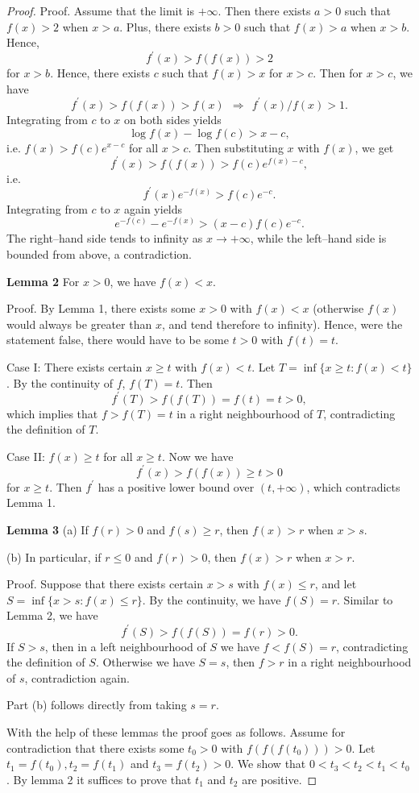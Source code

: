 \begin{1b}
\begin{enumerate}
\begin{proof}
Proof. Assume that the limit is $+\infty$. 
Then there exists $a>0$ such that $f(x)>2$ when $x>a$. 
Plus, there exists $b>0$ such that $f(x)>a$ when $x>b$. Hence, 
\[f^{\prime}(x)>f(f(x))>2\]
for $x>b$. Hence, there exists $c$ such that $f(x)>x$ for $x>c$. Then for $x>c$, we have
\[f^{\prime}(x)>f(f(x))>f(x) \ \ \Rightarrow \ \ f^{\prime}(x)/f(x)>1.\]
Integrating from $c$ to $x$ on both sides yields \[\log f(x)-\log f(c)>x-c,\]
i.e. $f(x)>f(c) e^{x-c}$ for all $x>c$. Then substituting $x$ with $f(x)$, we get
\[f^{\prime}(x)>f(f(x))>f(c) e^{f(x)-c},\]
i.e. \[f^{\prime}(x) e^{-f(x)}>f(c) e^{-c}.\]
Integrating from $c$ to $x$ again yields
\[e^{-f(c)}-e^{-f(x)}>(x-c) f(c) e^{-c}.\]
The right--hand side tends to infinity as $x\to+\infty$, 
while the left--hand side is bounded from above, a contradiction.

\textbf{Lemma 2} For $x>0$, we have $f(x)<x$.

Proof. By Lemma 1, there exists some $x>0$ with $f(x)<x$ 
(otherwise $f(x)$ would always be greater than $x$, and tend therefore to infinity). 
Hence, were the statement false, there would have to be some $t>0$ with $f(t)=t$.

Case I: There exists certain $x \geqslant t$ with $f(x)<t$. 
Let $T=\inf \{x \geqslant t: f(x)<t\}$. 
By the continuity of $f$, $f(T)=t$. Then
\[f^{\prime}(T)>f(f(T))=f(t)=t>0,\]
which implies that $f>f(T)=t$ in a right neighbourhood of $T$, 
contradicting the definition of $T$.

Case II: $f(x) \geqslant t$ for all $x \geqslant t$. Now we have
\[f^{\prime}(x)>f(f(x)) \geqslant t>0\]
for $x \geqslant t$. Then $f^{\prime}$ has a positive lower bound 
over $(t,+\infty)$, which contradicts Lemma 1.

\textbf{Lemma 3} (a) If $f(r)>0$ and $f(s) \geqslant r$, then $f(x)>r$ when $x>s$.

(b) In particular, if $r \leqslant 0$ and $f(r)>0$, then $f(x)>r$ when $x>r$.

Proof. Suppose that there exists certain $x>s$ with $f(x) \leqslant r$, 
and let $S=\inf \{x>s: f(x) \leqslant r\}$. 
By the continuity, we have $f(S)=r$. Similar to Lemma 2, we have
\[f^{\prime}(S)>f(f(S))=f(r)>0.\]
If $S>s$, then in a left neighbourhood of $S$ we have $f<f(S)=r$, 
contradicting the definition of $S$. 
Otherwise we have $S=s$, then $f>r$ in a right neighbourhood of $s$, 
contradiction again.

Part (b) follows directly from taking $s=r$.

With the help of these lemmas the proof goes as follows. 
Assume for contradiction that there exists some $t_0>0$ with $f(f(f(t_0)))>0$. 
Let $t_1=f(t_0), t_2=f(t_1)$ and $t_3=f(t_2)>0$. 
We show that $0<t_3<t_2<t_1<t_0$. By lemma 2 it suffices to prove that $t_1$ and $t_2$ are positive. 


\end{proof}
\end{enumerate}
\end{1b}
